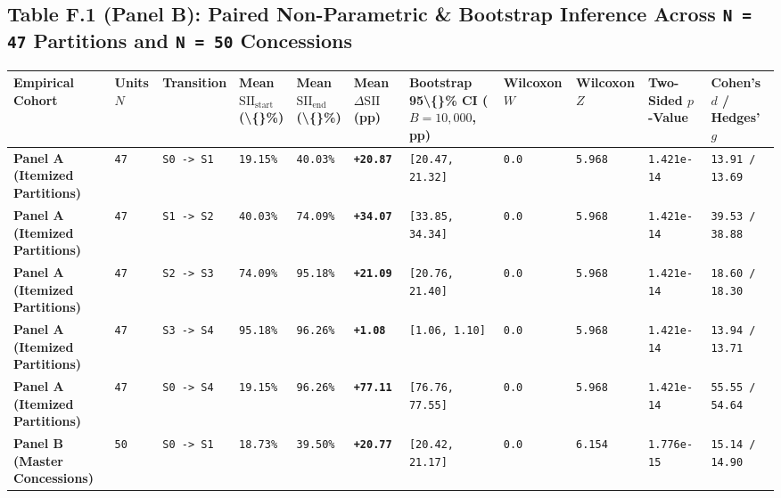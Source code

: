 \documentclass[10pt,a4paper]{article}
\begin{document}
\subsection*{Table F.1 (Panel B): Paired Non-Parametric \& Bootstrap Inference Across \texttt{N = 47} Partitions and \texttt{N = 50} Concessions}

{\scriptsize
\begin{longtable}{p{}p{}p{}p{}p{}p{}p{}p{}p{}p{}p{}}
\toprule
\textbf{Empirical Cohort} & \textbf{Units $N$} & \textbf{Transition} & \textbf{Mean $\text{SII}_{\text{start}}$ (\textbackslash\{\}\%)} & \textbf{Mean $\text{SII}_{\text{end}}$ (\textbackslash\{\}\%)} & \textbf{Mean $\Delta\text{SII}$ (pp)} & \textbf{Bootstrap 95\textbackslash\{\}\% CI ($B=10,000$, pp)} & \textbf{Wilcoxon $W$} & \textbf{Wilcoxon $Z$} & \textbf{Two-Sided $p$-Value} & \textbf{Cohen's $d$ / Hedges' $g$} \\
\midrule
\endhead
\textbf{Panel A (Itemized Partitions)} & \texttt{47} & \texttt{S0 -> S1} & \texttt{19.15\%} & \texttt{40.03\%} & \textbf{\texttt{+20.87}} & \texttt{[20.47, 21.32]} & \texttt{0.0} & \texttt{5.968} & \texttt{1.421e-14} & \texttt{13.91 / 13.69} \\
\textbf{Panel A (Itemized Partitions)} & \texttt{47} & \texttt{S1 -> S2} & \texttt{40.03\%} & \texttt{74.09\%} & \textbf{\texttt{+34.07}} & \texttt{[33.85, 34.34]} & \texttt{0.0} & \texttt{5.968} & \texttt{1.421e-14} & \texttt{39.53 / 38.88} \\
\textbf{Panel A (Itemized Partitions)} & \texttt{47} & \texttt{S2 -> S3} & \texttt{74.09\%} & \texttt{95.18\%} & \textbf{\texttt{+21.09}} & \texttt{[20.76, 21.40]} & \texttt{0.0} & \texttt{5.968} & \texttt{1.421e-14} & \texttt{18.60 / 18.30} \\
\textbf{Panel A (Itemized Partitions)} & \texttt{47} & \texttt{S3 -> S4} & \texttt{95.18\%} & \texttt{96.26\%} & \textbf{\texttt{+1.08}} & \texttt{[1.06, 1.10]} & \texttt{0.0} & \texttt{5.968} & \texttt{1.421e-14} & \texttt{13.94 / 13.71} \\
\textbf{Panel A (Itemized Partitions)} & \texttt{47} & \texttt{S0 -> S4} & \texttt{19.15\%} & \texttt{96.26\%} & \textbf{\texttt{+77.11}} & \texttt{[76.76, 77.55]} & \texttt{0.0} & \texttt{5.968} & \texttt{1.421e-14} & \texttt{55.55 / 54.64} \\
\textbf{Panel B (Master Concessions)} & \texttt{50} & \texttt{S0 -> S1} & \texttt{18.73\%} & \texttt{39.50\%} & \textbf{\texttt{+20.77}} & \texttt{[20.42, 21.17]} & \texttt{0.0} & \texttt{6.154} & \texttt{1.776e-15} & \texttt{15.14 / 14.90} \\

\end{longtable}}
\end{document}
